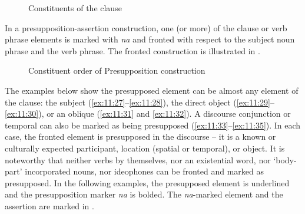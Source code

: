 \begin{figure}
\caption{Constituents of the clause\label{fig:18}}
\end{figure}

In a presupposition-assertion construction, one (or more) of the clause or verb phrase elements is marked with \textit{na} and fronted with respect to the subject noun phrase and the verb phrase. The fronted construction is illustrated in . 

\begin{figure}
\caption{Constituent order of Presupposition construction\label{fig:19}}
\end{figure}

The examples below show the presupposed element can be almost any element of the clause: the subject (\ref{ex:11:27}--\ref{ex:11:28}), the direct object (\ref{ex:11:29}--\ref{ex:11:30}), or an oblique (\ref{ex:11:31} and \ref{ex:11:32}). A discourse conjunction or temporal can also be marked as being presupposed (\ref{ex:11:33}--\ref{ex:11:35}). In each case, the fronted element is presupposed in the discourse -- it is a known or culturally expected participant, location (spatial or temporal), or object. It is noteworthy that neither verbs by themselves, nor an existential word, nor ‘body-part’ incorporated nouns, nor ideophones can be fronted and marked as presupposed. In the following examples, the presupposed element is underlined and the presupposition marker \textit{na} is bolded.  The \textit{na}-marked element and the assertion are marked in .
 \newpage


